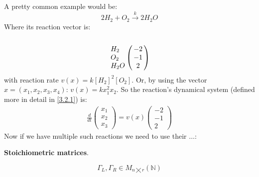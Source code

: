 A pretty common example would be:
\[
	2H_2 + O_2 \xrightarrow{k} 2H_2O
\]
Where its reaction vector is:
\[
	\bordermatrix{\cr \cr
		H_2 & -2 \cr
		O_2 & -1 \cr
		H_2O & 2 \cr
	}
\]
with reaction rate $v(x) = k[H_2]^2[O_2]$. Or, by using the vector $x=(x_1, x_2, x_3, x_4)$: $v(x) = k x_1^2 x_2$.
So the reaction's dynamical system (defined more in detail in \ref{3.2.1}) is:
\begin{align*}
	\frac{d}{dt}
	\begin{pmatrix*}
		x_1 \\
		x_2 \\
		x_3
	\end{pmatrix*} =
	v(x)
	\begin{pmatrix}
		-2 \\
		-1 \\
		2
	\end{pmatrix}
\end{align*}
Now if we have multiple such reactions we need to use their $\ldots$:
\begin{definition}
	\textbf{Stoichiometric matrices}.

	\[
		\Gamma_L, \Gamma_R \in M_{n \bigtimes r}(\mathbb{N})
	\]
\end{definition}